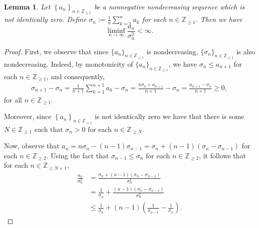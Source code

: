 \documentclass[11pt, reqno, a4paper]{amsart}
\newtheorem{lemma}[theorem]{Lemma}
\theoremstyle{definition}
\renewcommand{\le}{\leqslant}
\renewcommand{\ge}{\geqslant}
\newcommand{\Z}{\mathbb Z}
\numberwithin{equation}{section}
\begin{document}
\begin{lemma}
    Let $\left\{ a_n \right\}_{n \in \Z_{\ge 1}}$ be a nonnegative nondecreasing sequence which is not identically zero. Define $\sigma_n := \frac{1}{n} \sum_{k=1}^{n} a_k$ for each $n \in \Z_{\ge 1}$. Then we have
    \begin{equation*}
        \liminf_{n \to \infty} \frac{a_n}{\sigma_n ^{2}} < \infty.
    \end{equation*}
    \label{lem:Cesaro}
\end{lemma}
\begin{proof}
    First, we observe that since $\{ a_n \}_{n \in \Z_{\ge1}}$ is nondecreasing, $\{ \sigma_{n} \}_{n \in \Z_{\ge 1}}$ is also nondecreasing. Indeed, by monotonicity of $\{ a_n \}_{n \in \Z_{\ge1}}$, we have $\sigma_n \le a_{n+1}$ for each $n \in \Z_{\ge 1}$, and consequently,
    \begin{equation*}
        \begin{aligned}
            \sigma_{n+1} - \sigma_n = \frac{1}{n+1} \sum_{k=1}^{n+1} a_k - \sigma_n 
                                    = \frac{n \sigma_n + a_{n+1}}{n+1} - \sigma_n 
                                    = \frac{a_{n+1} - \sigma_n}{n+1} \ge 0,
        \end{aligned}
    \end{equation*}
    for all $n \in \Z_{\ge 1}$.

    Moreover, since $\left\{ a_n \right\}_{n \in \Z_{\ge 1}}$ is not identically zero we have that there is some $N \in \Z_{\ge 1}$ such that $\sigma_n > 0$ for each $n \in \Z_{\ge N}$.

    Now, observe that $a_n = n \sigma_n - (n-1) \sigma_{n-1} = \sigma_n + (n-1) (\sigma_n - \sigma_{n-1})$ for each $n \in \Z_{\ge 2}$. Using the fact that $\sigma_{n-1} \le \sigma_{n}$ for each $n \in \Z_{\ge 2}$, it follows that for each $n \in \Z_{\ge N+1}$,
    \begin{equation}
        \begin{aligned}
        \frac{a_n}{\sigma_n ^2} &= \frac{\sigma_n + (n-1) (\sigma_n - \sigma_{n-1})}{\sigma_n ^2} \\
        &= \frac{1}{\sigma_n} + \frac{(n-1) (\sigma_n - \sigma_{n-1})}{\sigma_{n} ^2} \\
        &\le \frac{1}{\sigma_n} + (n-1) \left( \frac{1}{\sigma_{n-1}} - \frac{1}{\sigma_n} \right).
    \end{aligned}
    \label{eq:Cesaro-estimate}
    \end{equation}
    

\end{proof}
\end{document}
